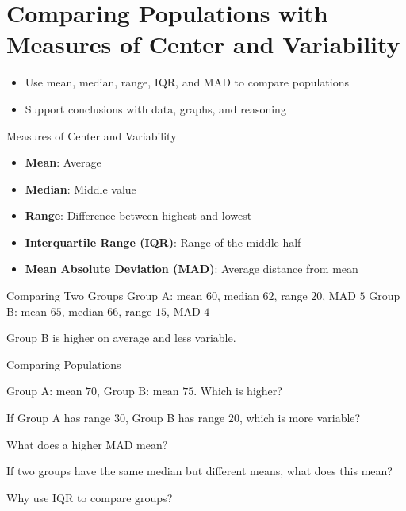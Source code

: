 \section{Comparing Populations with Measures of Center and Variability}

\begin{learningGoals}
\begin{itemize}
    \item Use mean, median, range, IQR, and MAD to compare populations
    \item Support conclusions with data, graphs, and reasoning
\end{itemize}
\end{learningGoals}

\begin{conceptBox}{Measures of Center and Variability}
\begin{itemize}[leftmargin=*]
    \item \textbf{Mean}: Average
    \item \textbf{Median}: Middle value
    \item \textbf{Range}: Difference between highest and lowest
    \item \textbf{Interquartile Range (IQR)}: Range of the middle half
    \item \textbf{Mean Absolute Deviation (MAD)}: Average distance from mean
\end{itemize}
\end{conceptBox}

\begin{workedExample}{Comparing Two Groups}
Group A: mean $60$, median $62$, range $20$, MAD $5$
Group B: mean $65$, median $66$, range $15$, MAD $4$

Group B is higher on average and less variable.
\end{workedExample}


\begin{practiceBox}{Comparing Populations}
\resetProblems

\prob Group A: mean $70$, Group B: mean $75$. Which is higher?

\prob If Group A has range $30$, Group B has range $20$, which is more variable?

\prob What does a higher MAD mean?

\prob If two groups have the same median but different means, what does this mean?

\prob Why use IQR to compare groups?

\end{practiceBox}
